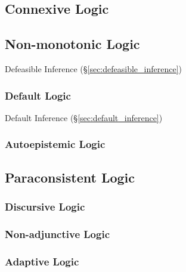 \subsection{Connexive Logic}\label{sec:connexive_logic}

\subsection{Non-monotonic Logic}\label{sec:nonmonotonic_logic}

Defeasible Inference (\S\ref{sec:defeasible_inference})



\subsubsection{Default Logic}\label{sec:default_logic}

Default Inference (\S\ref{sec:default_inference})



\subsubsection{Autoepistemic Logic}\label{sec:autoepistemic_logic}



\subsection{Paraconsistent Logic}\label{sec:paraconsistent_logic}

\subsubsection{Discursive Logic}\label{sec:discursive_logic}

\subsubsection{Non-adjunctive Logic}\label{sec:nonadjunctive_logic}

\subsubsection{Adaptive Logic}\label{sec:adaptive_logic}


